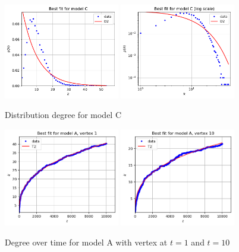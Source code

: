 \documentclass[a4paper]{article}
\begin{document}
%
\begin{figure}[H]
		\centering
		\includegraphics[width=0.45\textwidth]{modelC/best_dd.pdf}
		\includegraphics[width=0.45\textwidth]{modelC/best_log_dd.pdf}
		\caption{Distribution degree for model C}
		\label{fig:best_dd_C}
\end{figure}
%
\begin{figure}[H]
		\centering
		\includegraphics[width=0.45\textwidth]{modelA/best_dt1.png}
		\includegraphics[width=0.45\textwidth]{modelA/best_dt10.png}
		\caption{Degree over time for model A with vertex at $t=1$ and $t=10$}
		\label{fig:best_dt1_A}
\end{figure}
\end{document}
